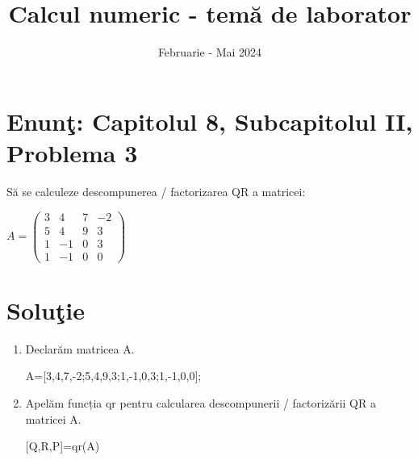 \documentclass{article}
\begin{document}
\title{Calcul numeric - tem\u{a} de laborator}

\author{}

\date{Februarie - Mai 2024}

\maketitle              %








\section*{Enun\c{t}: Capitolul 8, Subcapitolul II, Problema 3}

S\u{a} se calculeze descompunerea / factorizarea QR a matricei:
\begin{center}
$
A=\begin{pmatrix}
3 & 4 & 7 & -2\\
5 & 4 & 9 & 3\\
1 & -1 & 0 & 3\\
1 & -1 & 0 & 0
\end{pmatrix}
$
\end{center}

\section*{Solu\c{t}ie}

\begin{center}
\begin{enumerate}
    \item 
    Declarăm matricea A. \\
    \begin{center}
    A=[3,4,7,-2;5,4,9,3;1,-1,0,3;1,-1,0,0];
    \end{center}
    \item 
    Apelăm funcția qr pentru calcularea descompunerii / factorizării QR a matricei A. \\
    \begin{center}
    [Q,R,P]=qr(A)
    \end{center}
\end{enumerate}
\end{center}
\end{document}
